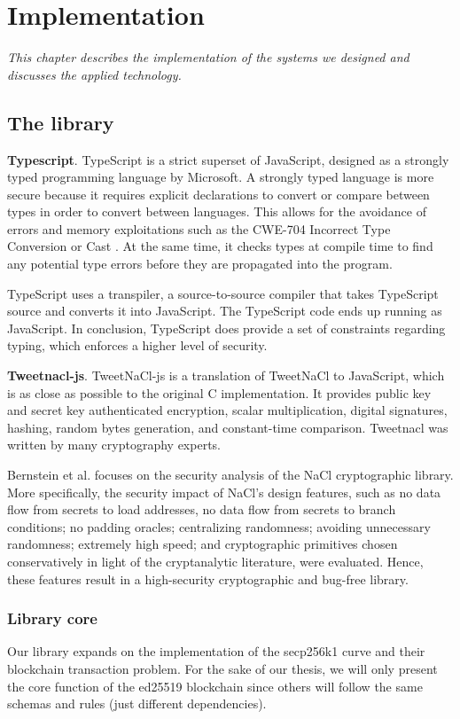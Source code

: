 \chapter{Implementation} \label{chap:System_implementation}
\textit{This chapter describes the implementation of the systems we designed and discusses the applied technology.}

\minitoc

\section{The library}
\bigskip
{\textbf{Typescript}}. TypeScript is a strict superset of JavaScript, designed as a strongly typed programming language by Microsoft. A strongly typed language is more secure because it requires explicit declarations to convert or compare between types in order to convert between languages. This allows for the avoidance of errors and memory exploitations such as the CWE-704 Incorrect Type Conversion or Cast \cite{cwe}. At the same time, it checks types at compile time to find any potential type errors before they are propagated into the program.

TypeScript uses a transpiler, a source-to-source compiler that takes TypeScript source and converts it into JavaScript. The TypeScript code ends up running as JavaScript. In conclusion, TypeScript does provide a set of constraints regarding typing, which enforces a higher level of security.

\bigskip
{\textbf{Tweetnacl-js}}. TweetNaCl-js is a translation of TweetNaCl to JavaScript, which is as close as possible to the original C implementation. It provides public key and secret key authenticated encryption, scalar multiplication, digital signatures, hashing, random bytes generation, and constant-time comparison. Tweetnacl was written by many cryptography experts.

Bernstein et al. \cite{Bernstein2012} focuses on the security analysis of the NaCl cryptographic library.
More specifically, the security impact of NaCl's design features, such as no data flow
from secrets to load addresses, no data flow from secrets to branch conditions; no padding oracles; centralizing randomness; avoiding unnecessary randomness; extremely high speed; and cryptographic primitives chosen conservatively in light of the cryptanalytic literature, were evaluated. Hence, these features result in a high-security cryptographic and bug-free library.

\subsection{Library core}
Our library expands on the implementation of the secp256k1 curve and their blockchain transaction problem. For the sake of our thesis, we will only present the core function of the ed25519 blockchain since others will follow the same schemas and rules (just different dependencies).


